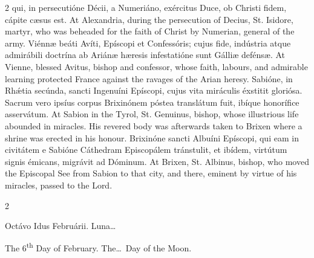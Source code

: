 \begin{paracol}{2}
 qui, in persecutióne Décii, a Numeriáno, exércitus Duce, ob Christi fidem, 
 cápite cæsus est.
\switchcolumn
{}
At Alexandria, during the persecution of Decius, St. Isidore, martyr, who 
 was beheaded for the faith of Christ by Numerian, general of the army.
\switchcolumn*
{}
Viénnæ beáti Avíti, Epíscopi et Confessóris; 
 cujus fide, indústria atque admirábili doctrína ab Ariánæ hæresis 
 infestatióne sunt Gálliæ defénsæ.
\switchcolumn
{}
At Vienne, blessed Avitus, bishop and confessor, whose faith, labours, and 
 admirable learning protected France against the ravages of the Arian heresy.
\switchcolumn*
{}
Sabióne, in Rhǽtia secúnda, sancti Ingenuíni 
 Epíscopi, cujus vita miráculis éxstitit gloriósa. Sacrum vero ipsíus 
 corpus Brixinónem póstea translátum fuit, ibíque honorífice asservátum.
\switchcolumn
{}
At Sabion in the Tyrol, St. Genuinus, bishop, whose illustrious life 
 abounded in miracles. His revered body was afterwards taken to Brixen 
 where a shrine was erected in his honour.
\switchcolumn*
{}
Brixinóne sancti Albuíni Epíscopi, qui eam in civitátem e Sabióne Cáthedram 
 Episcopálem tránstulit, et ibídem, virtútum signis
 émicans, migrávit ad Dóminum.
\switchcolumn
{}
At Brixen, St. Albinus, bishop, who moved the Episcopal See from Sabion to 
 that city, and there, eminent by virtue of his miracles, passed to the Lord.
\switchcolumn*
{}
\end{paracol}


\begin{paracol}{2}
\begin{center}{\color{gregoriocolor} Octávo Idus Februárii. 
 Luna\dots\ }\end{center}
\switchcolumn
{}
\begin{center}{\color{gregoriocolor} The 6\textsuperscript{th} Day of 
 February. The\dots\ Day of the Moon.}\end{center}
\end{paracol}

